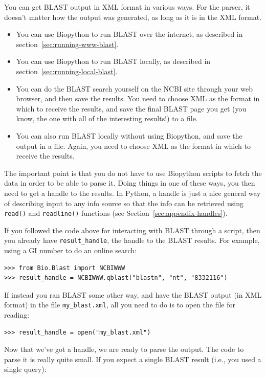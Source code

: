 You can get BLAST output in XML format in various ways. For the parser, it
doesn't matter how the output was generated, as long as it is in the XML format.
\begin{itemize}
\item You can use Biopython to run BLAST over the internet, as described in
section~\ref{sec:running-www-blast}.
\item You can use Biopython to run BLAST locally, as described in
section~\ref{sec:running-local-blast}.
\item You can do the BLAST search yourself on the NCBI site through your
web browser, and then save the results. You need to choose XML as the format
in which to receive the results, and save the final BLAST page you get
(you know, the one with all of the interesting results!) to a file.
\item You can also run BLAST locally without using Biopython, and save
the output in a file. Again, you need to choose XML as the format in which
to receive the results.
\end{itemize}
The important point is that you do not have to use Biopython
scripts to fetch the data in order to be able to parse it.
Doing things in one of these ways, you then need to get a handle
to the results. In Python, a handle is just a nice general way of
describing input to any info source so that the info can be retrieved
using \verb|read()| and \verb|readline()| functions
(see Section~\ref{sec:appendix-handles}).

If you followed the code above for interacting with BLAST through a
script, then you already have \verb|result_handle|, the handle to the
BLAST results.  For example, using a GI number to do an online search:

\begin{verbatim}
>>> from Bio.Blast import NCBIWWW
>>> result_handle = NCBIWWW.qblast("blastn", "nt", "8332116")
\end{verbatim}

If instead you ran BLAST some other way, and have the
BLAST output (in XML format) in the file \verb|my_blast.xml|, all you
need to do is to open the file for reading:

\begin{verbatim}
>>> result_handle = open("my_blast.xml")
\end{verbatim}

Now that we've got a handle, we are ready to parse the output. The
code to parse it is really quite small.  If you expect a single
BLAST result (i.e., you used a single query):

